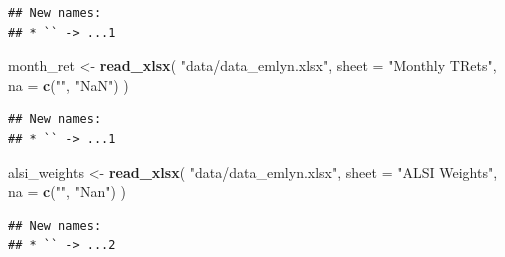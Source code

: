 \documentclass[
]{article}
\newenvironment{Shaded}{\begin{snugshade}}{\end{snugshade}}
\newcommand{\DataTypeTok}[1]{\textcolor[rgb]{0.13,0.29,0.53}{#1}}
\newcommand{\KeywordTok}[1]{\textcolor[rgb]{0.13,0.29,0.53}{\textbf{#1}}}
\newcommand{\NormalTok}[1]{#1}
\newcommand{\StringTok}[1]{\textcolor[rgb]{0.31,0.60,0.02}{#1}}
\begin{document}
\begin{verbatim}
## New names:
## * `` -> ...1
\end{verbatim}

\begin{Shaded}
\begin{Highlighting}[]
\NormalTok{month\_ret \textless{}{-}}\StringTok{ }\KeywordTok{read\_xlsx}\NormalTok{(}
  \StringTok{"data/data\_emlyn.xlsx"}\NormalTok{,}
  \DataTypeTok{sheet =} \StringTok{"Monthly TRets"}\NormalTok{,}
  \DataTypeTok{na =} \KeywordTok{c}\NormalTok{(}\StringTok{""}\NormalTok{, }\StringTok{"NaN"}\NormalTok{)}
\NormalTok{)}
\end{Highlighting}
\end{Shaded}

\begin{verbatim}
## New names:
## * `` -> ...1
\end{verbatim}

\begin{Shaded}
\begin{Highlighting}[]
\NormalTok{alsi\_weights \textless{}{-}}\StringTok{ }\KeywordTok{read\_xlsx}\NormalTok{(}
  \StringTok{"data/data\_emlyn.xlsx"}\NormalTok{,}
  \DataTypeTok{sheet =} \StringTok{"ALSI Weights"}\NormalTok{,}
  \DataTypeTok{na =} \KeywordTok{c}\NormalTok{(}\StringTok{""}\NormalTok{, }\StringTok{"Nan"}\NormalTok{)}
\NormalTok{)}
\end{Highlighting}
\end{Shaded}

\begin{verbatim}
## New names:
## * `` -> ...2
\end{verbatim}
\end{document}
